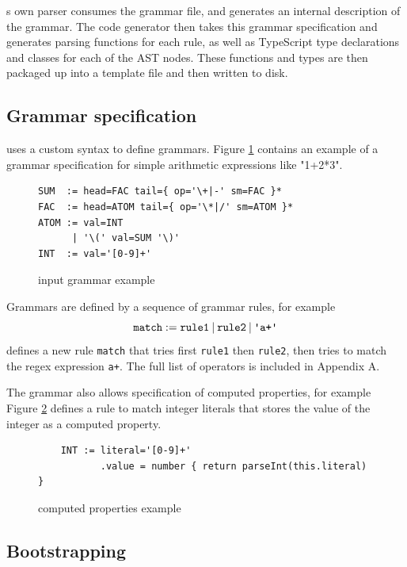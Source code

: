 \tsPEG{}s own parser consumes the grammar file, and generates an internal description of the grammar. The code generator then takes this grammar specification and generates parsing functions for each rule, as well as TypeScript type declarations and classes for each of the AST nodes. These functions and types are then packaged up into a template file and then written to disk.

\subsection{Grammar specification}

\tsPEG{} uses a custom syntax to define grammars. Figure \ref{tspegexample} contains an example of a grammar specification for simple arithmetic expressions like "1+2*3".

\begin{figure}
    \caption{\tsPEG{} input grammar example}
    \label{tspegexample}
    \begin{lstlisting}
SUM  := head=FAC tail={ op='\+|-' sm=FAC }*
FAC  := head=ATOM tail={ op='\*|/' sm=ATOM }*
ATOM := val=INT
      | '\(' val=SUM '\)'
INT  := val='[0-9]+'
    \end{lstlisting}
\end{figure}

Grammars are defined by a sequence of grammar rules, for example
    \[\texttt{match} := \texttt{rule1} \mathbin{|} \texttt{rule2} \mathbin{|} \texttt{\textquotesingle a+\textquotesingle}\]
    defines a new rule \verb|match| that tries first \verb|rule1| then \verb|rule2|, then tries to match the regex expression \verb|a+|. The full list of operators is included in Appendix A.

    The \tsPEG{} grammar also allows specification of computed properties, for example Figure \ref{tspegcomputed} defines a rule to match integer literals that stores the value of the integer as a computed property.

\begin{figure}
    \caption{\tsPEG{} computed properties example}
    \label{tspegcomputed}
    \begin{lstlisting}
    INT := literal='[0-9]+'
           .value = number { return parseInt(this.literal) }
    \end{lstlisting}
\end{figure}

\subsection{Bootstrapping}

